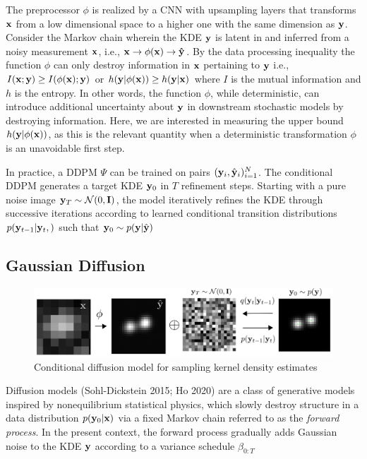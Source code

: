 \documentclass{article}
\begin{document}
The preprocessor $\phi$ is realized by a CNN with upsampling layers that transforms $\bold{x}$ from a low dimensional space to a higher one with the same dimension as $\bold{y}$. Consider the Markov chain wherein the KDE $\bold{y}$ is latent in and inferred from a noisy measurement $\bold{x}$, i.e., $\bold{x} \rightarrow \phi(\bold{x})\rightarrow \bold{\hat{y}}$. By the data processing inequality the function $\phi$ can only destroy information in $\bold{x}$ pertaining to $\bold{y}$ i.e., $I(\bold{x};\bold{y}) \geq I(\phi(\bold{x});\bold{y})$ or $h(\bold{y}|\phi(\bold{x})) \geq h(\bold{y}|\bold{x})$ where $I$ is the mutual information and $h$ is the entropy. In other words, the function $\phi$, while deterministic, can introduce additional uncertainty about $\bold{y}$ in downstream stochastic models by destroying information. Here, we are interested in measuring the upper bound $h(\bold{y}|\phi(\bold{x}))$, as this is the relevant quantity when a deterministic transformation $\phi$ is an unavoidable first step. 

In practice, a DDPM $\Psi$ can be trained on pairs $(\bold{y}_i,\hat{\bold{y}}_{i})_{i=1}^{N}$. The conditional DDPM generates a target KDE $\bold{y}_0$ in $T$ refinement steps. Starting with a pure noise image $\bold{y}_{T}\sim \mathcal{N}(0,\bold{I})$, the model iteratively refines the KDE through successive iterations according to learned conditional transition distributions $p(\bold{y}_{t-1}|\bold{y}_{t},\bold{})$ such that $\bold{y}_{0} \sim p(\bold{y}|\hat{\bold{y}})$ 

\subsection{Gaussian Diffusion}

\begin{figure}
\includegraphics[scale=4.5]{Denoise.png}
\caption{Conditional diffusion model for sampling kernel density estimates}
\end{figure}

Diffusion models (Sohl-Dickstein 2015; Ho 2020) are a class of generative models inspired by nonequilibrium statistical physics, which slowly destroy structure in a data distribution $p(\bold{y}_{0}|\bold{x})$ via a fixed Markov chain referred to as the \emph{forward process}. In the present context, the forward process gradually adds Gaussian noise to the KDE $\bold{y}$ according to a variance schedule $\beta_{0:T}$
\end{document}
